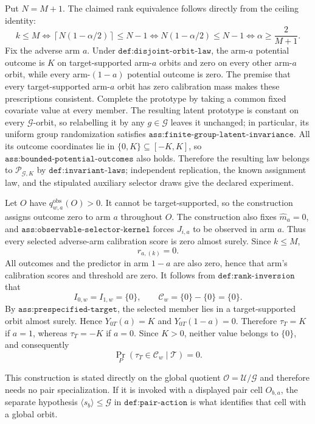 Put \(N=M+1\). The claimed rank equivalence follows directly from the ceiling identity: 
\[k\le M\iff \left\lceil N(1-\alpha/2)\right\rceil\le N-1\iff N(1-\alpha/2)\le N-1\iff \alpha\ge\frac{2}{M+1}.\]
Fix the adverse arm \(a\). Under \(\texttt{def:disjoint-orbit-law}\), the arm-\(a\) potential outcome is \(K\) on target-supported arm-\(a\) orbits and zero on every other arm-\(a\) orbit, while every arm-\((1-a)\) potential outcome is zero. The premise that every target-supported arm-\(a\) orbit has zero calibration mass makes these prescriptions consistent. Complete the prototype by taking a common fixed covariate value at every member. The resulting latent prototype is constant on every \(\mathcal G\)-orbit, so relabelling it by any \(g\in\mathcal G\) leaves it unchanged; in particular, its uniform group randomization satisfies \(\texttt{ass:finite-group-latent-invariance}\). All its outcome coordinates lie in \(\{0,K\}\subseteq[-K,K]\), so \(\texttt{ass:bounded-potential-outcomes}\) also holds. Therefore the resulting law belongs to \(\mathcal P_{\mathcal G,K}\) by \(\texttt{def:invariant-laws}\); independent replication, the known assignment law, and the stipulated auxiliary selector draws give the declared experiment.

Let \(O\) have \(q^{\mathrm{obs}}_{w,a}(O)>0\). It cannot be target-supported, so the construction assigns outcome zero to arm \(a\) throughout \(O\). The construction also fixes \(\widehat m_a=0\), and \(\texttt{ass:observable-selector-kernel}\) forces \(J_{i,a}\) to be observed in arm \(a\). Thus every selected adverse-arm calibration score is zero almost surely. Since \(k\le M\),
\[r_{a,(k)}=0.\]
All outcomes and the predictor in arm \(1-a\) are also zero, hence that arm's calibration scores and threshold are zero. It follows from \(\texttt{def:rank-inversion}\) that
\[I_{0,w}=I_{1,w}=\{0\},\qquad \mathcal C_w=\{0\}-\{0\}=\{0\}.\]
By \(\texttt{ass:prespecified-target}\), the selected member lies in a target-supported orbit almost surely. Hence \(Y_{0T}(a)=K\) and \(Y_{0T}(1-a)=0\). Therefore \(\tau_T=K\) if \(a=1\), whereas \(\tau_T=-K\) if \(a=0\). Since \(K>0\), neither value belongs to \(\{0\}\), and consequently
\[\Pr_P(\tau_T\in\mathcal C_w\mid\mathcal T)=0.\]

This construction is stated directly on the global quotient \(\mathcal O=\mathcal U/\mathcal G\) and therefore needs no pair specialization. If it is invoked with a displayed pair cell \(O_{b,a}\), the separate hypothesis \(\langle s_b\rangle\le\mathcal G\) in \(\texttt{def:pair-action}\) is what identifies that cell with a global orbit.